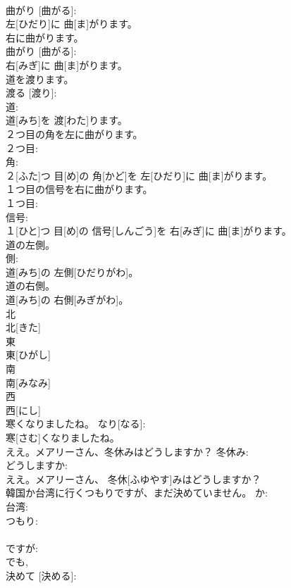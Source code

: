 \documentclass[8pt]{extreport}
\begin{document}
\begin{CJK}{UTF8}{min}
\\	曲がり [曲がる]: 
\\	左[ひだり]に 曲[ま]がります。		
\\	右に曲がります。	
\\	曲がり [曲がる]: 
\\	右[みぎ]に 曲[ま]がります。		
\\	道を渡ります。	
\\	渡る [渡り]: 
\\	道: 
\\	道[みち]を 渡[わた]ります。		
\\	２つ目の角を左に曲がります。	
\\	２つ目: 
\\	角: 
\\	２[ふた]つ 目[め]の 角[かど]を 左[ひだり]に 曲[ま]がります。		
\\	１つ目の信号を右に曲がります。	
\\	１つ目: 
\\	信号: 
\\	１[ひと]つ 目[め]の 信号[しんごう]を 右[みぎ]に 曲[ま]がります。		
\\	道の左側。	
\\	側: 
\\	道[みち]の 左側[ひだりがわ]。		
\\	道の右側。	
\\	道[みち]の 右側[みぎがわ]。		
\\	北	
\\	北[きた]		
\\	東	
\\	東[ひがし]		
\\	南	
\\	南[みなみ]		
\\	西	
\\	西[にし]		
\\	寒くなりましたね。	なり[なる]: 
\\	寒[さむ]くなりましたね。	
\\	ええ。メアリーさん、冬休みはどうしますか？	冬休み: 
\\	どうしますか: 
\\	ええ。メアリーさん、 冬休[ふゆやす]みはどうしますか？		
\\	韓国か台湾に行くつもりですが、まだ決めていません。	か: 
\\	台湾: 
\\	つもり: 
\\	[行く] 
\\	ですが: 
\\	でも, 
\\	決めて [決める]: 

\end{CJK}
\end{document}
